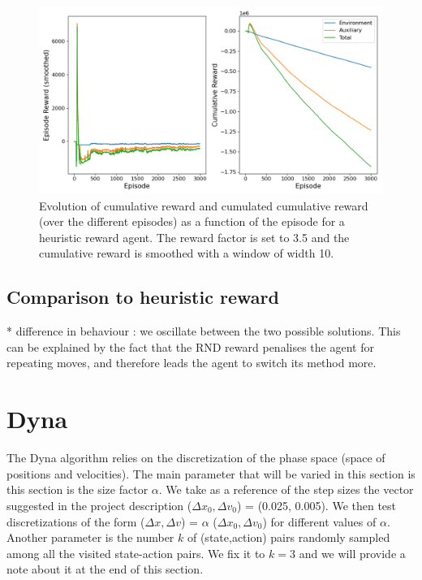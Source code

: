 \documentclass[a4paper, 12pt,oneside]{article}
\begin{document}
        \begin{figure}[h!]
            \centering
            \vspace{0em}
            \includegraphics[width=.75\textwidth]{../runs/dqn_rnd/up-tau=1_r-fact=35.0/figs/reward}
            \caption{Evolution of cumulative reward and cumulated cumulative reward (over the different episodes) as a function of the episode for a heuristic reward agent. The reward factor is set to 3.5 and the cumulative reward is smoothed with a window of width 10.}
            \label{fig:dqn-rnd-r-fact=35-reward}
        \end{figure}
        \subsection{Comparison to heuristic reward}
        * difference in behaviour : we oscillate between the two possible solutions. This can be explained by the fact that the RND reward penalises the agent for repeating moves, and therefore leads the agent to switch its method more. 
    
        \section{Dyna}
        The Dyna algorithm relies on the discretization of the phase space (space of positions and velocities).
        The main parameter that will be varied in this section is this section is the size factor $\alpha$. We take as a reference of the step sizes the vector suggested in the project description ($\Delta x_0, \Delta v_0$) = (0.025, 0.005). We then test discretizations of the form ($\Delta x, \Delta v$) = $\alpha$ ($\Delta x_0, \Delta v_0$) 
        for different values of $\alpha$. Another parameter is the number $k$ of (state,action) pairs randomly sampled among all the visited state-action pairs. We fix it to $k=3$ and we will provide a note about it at the end of this section. 
\end{document}
